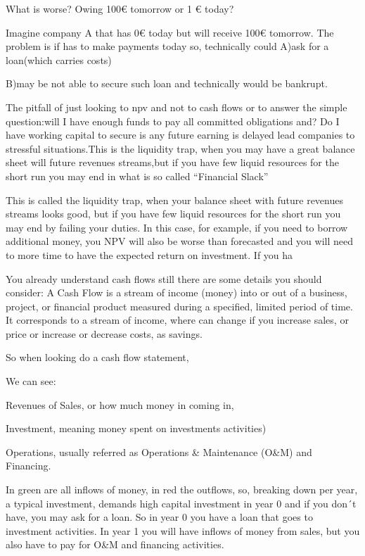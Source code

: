 \documentclass[]{book}
\newcommand{\euro}{€}
\theoremstyle{definition}
\theoremstyle{definition}
\theoremstyle{definition}
\theoremstyle{remark}
\begin{document}
What is worse? Owing 100\euro{} tomorrow or 1 \euro{} today?

Imagine company A that has 0\euro{} today but will receive 100\euro{}
tomorrow. The problem is if has to make payments today so, technically
could A)ask for a loan(which carries costs)

B)may be not able to secure such loan and technically would be bankrupt.

The pitfall of just looking to npv and not to cash flows or to answer
the simple question:will I have enough funds to pay all committed
obligations and? Do I have working capital to secure is any future
earning is delayed lead companies to stressful situations.This is the
liquidity trap, when you may have a great balance sheet will future
revenues streams,but if you have few liquid resources for the short run
you may end in what is so called ``Financial Slack''

This is called the liquidity trap, when your balance sheet with future
revenues streams looks good, but if you have few liquid resources for
the short run you may end by failing your duties. In this case, for
example, if you need to borrow additional money, you NPV will also be
worse than forecasted and you will need to more time to have the
expected return on investment. If you ha

You already understand cash flows still there are some details you
should consider: A Cash Flow is a stream of income (money) into or out
of a business, project, or financial product measured during a
specified, limited period of time. It corresponds to a stream of income,
where can change if you increase sales, or price or increase or decrease
costs, as savings.

So when looking do a cash flow statement,

We can see:

Revenues of Sales, or how much money in coming in,

Investment, meaning money spent on investments activities)

Operations, usually referred as Operations \& Maintenance (O\&M) and
Financing.

In green are all inflows of money, in red the outflows, so, breaking
down per year, a typical investment, demands high capital investment in
year 0 and if you don´t have, you may ask for a loan. So in year 0 you
have a loan that goes to investment activities. In year 1 you will have
inflows of money from sales, but you also have to pay for O\&M and
financing activities.
\end{document}
